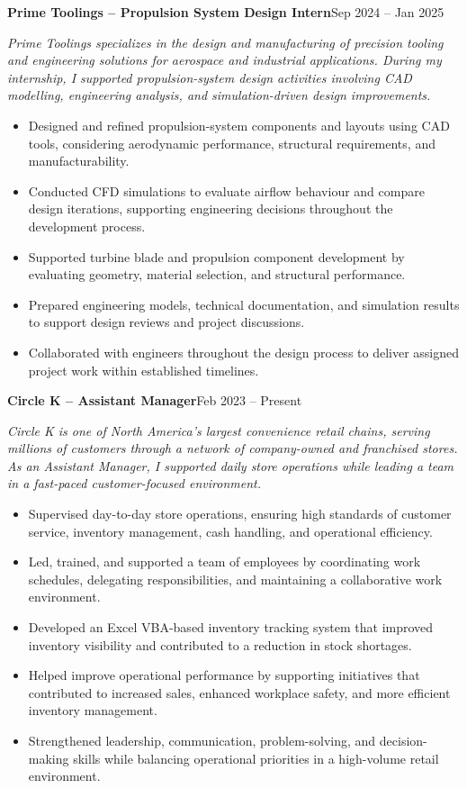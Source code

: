 \documentclass[10pt, letterpaper]{article}
\newcommand{\jobheader}[3]{\vspace{5pt}\textbf{#1 {--} #2}\hfill{\small\color{black}#3}\par\vspace{1pt}}
\newcommand{\jobcontext}[1]{{\small\textit{#1}}\vspace{3pt}\par}
\begin{document}
\jobheader{Prime Toolings}{Propulsion System Design Intern}{Sep 2024 -- Jan 2025}
\jobcontext{Prime Toolings specializes in the design and manufacturing of precision tooling and engineering solutions for aerospace and industrial applications. During my internship, I supported propulsion-system design activities involving CAD modelling, engineering analysis, and simulation-driven design improvements.}
\begin{itemize}
  \item Designed and refined propulsion-system components and layouts using CAD tools, considering aerodynamic performance, structural requirements, and manufacturability.
  \item Conducted CFD simulations to evaluate airflow behaviour and compare design iterations, supporting engineering decisions throughout the development process.
  \item Supported turbine blade and propulsion component development by evaluating geometry, material selection, and structural performance.
  \item Prepared engineering models, technical documentation, and simulation results to support design reviews and project discussions.
  \item Collaborated with engineers throughout the design process to deliver assigned project work within established timelines.
\end{itemize}

\vspace{3pt}

\jobheader{Circle K}{Assistant Manager}{Feb 2023 -- Present}
\jobcontext{Circle K is one of North America's largest convenience retail chains, serving millions of customers through a network of company-owned and franchised stores. As an Assistant Manager, I supported daily store operations while leading a team in a fast-paced customer-focused environment.}
\begin{itemize}
  \item Supervised day-to-day store operations, ensuring high standards of customer service, inventory management, cash handling, and operational efficiency.
  \item Led, trained, and supported a team of employees by coordinating work schedules, delegating responsibilities, and maintaining a collaborative work environment.
  \item Developed an Excel VBA-based inventory tracking system that improved inventory visibility and contributed to a reduction in stock shortages.
  \item Helped improve operational performance by supporting initiatives that contributed to increased sales, enhanced workplace safety, and more efficient inventory management.
  \item Strengthened leadership, communication, problem-solving, and decision-making skills while balancing operational priorities in a high-volume retail environment.
\end{itemize}
\end{document}
